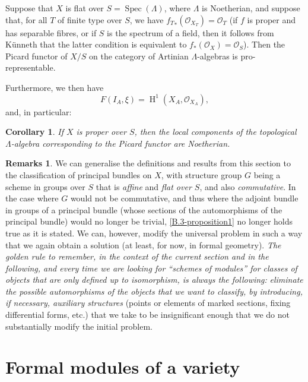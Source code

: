 \documentclass{article}
\theoremstyle{plain}
\newenvironment{proposition}[1]
  {\renewcommand\theinnercustomproposition{#1}\innercustomproposition}
  {\endinnercustomproposition}
\newtheorem*{corollary*}{Corollary}
\theoremstyle{definition}
\newtheorem*{remarks*}{Remarks}
\newcommand{\sh}[1]{{\mathscr{#1}}}
\DeclareMathOperator{\HH}{H}
\DeclareMathOperator{\Spec}{Spec}
\newcommand{\oldpage}[1]{\marginpar{\footnotesize$\Big\vert$ \textit{p.~#1}}}
\begin{document}
\begin{proposition}{3.1}
\label{B.3-proposition1}
  Suppose that $X$ is flat over $S=\Spec(\Lambda)$, where $\Lambda$ is Noetherian, and suppose that, for all $T$ of finite type over $S$, we have ${f_T}_*(\sh{O}_{X_T})=\sh{O}_T$ (if $f$ is proper and has separable fibres, or if $S$ is the spectrum of a field, then it follows from K\"{u}nneth that the latter condition is equivalent to $f_*(\sh{O}_X)=\sh{O}_S$).
  Then the Picard functor of $X/S$ on the category of Artinian $\Lambda$-algebras is pro-representable.

  Furthermore, we then have
  \[
    F(I_A,\xi) = \HH^1(X_A,\sh{O}_{X_A}),
  \]
  and, in particular:
\end{proposition}

\begin{corollary*}
  If $X$ is proper over $S$, then the local components of the topological $\Lambda$-algebra corresponding to the Picard functor are Noetherian.
\end{corollary*}

\begin{remarks*}
  We can generalise the definitions and results from this section to the classification of principal bundles on $X$, with structure group $G$ being a scheme in groups over $S$ that is \emph{affine} and \emph{flat over $S$}, and also \emph{commutative}.
  In the case where $G$ would not be commutative, and thus where the adjoint bundle in groups of a principal bundle (whose sections of the automorphisms of the principal bundle) would no longer be trivial, \cref{B.3-proposition1} no longer holds true as it is stated.
  We can, however, modify the universal problem in such a way that we again obtain a solution (at least, for now, in formal geometry).
  \emph{The golden rule to remember, in the context of the current}
\oldpage{195-17}
  \emph{section and in the following, and every time we are looking for ``schemes of modules'' for classes of objects that are only defined up to isomorphism, is always the following:}
  \emph{eliminate the possible automorphisms of the objects that we want to classify, by introducing, if necessary, auxiliary structures} (points or elements of marked sections, fixing differential forms, etc.) that we take to be insignificant enough that we do not substantially modify the initial problem.
\end{remarks*}


\section{Formal modules of a variety}
\label{B.4}
\end{document}

